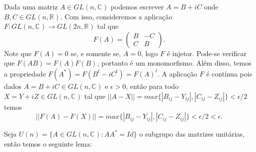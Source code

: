\documentclass[12pt]{book}
\newcommand{\complexo}[1]{\mathbb{C}^{#1}}
\newcommand{\generalgroup}[2]{GL(#1, #2)}
\newcommand{\generalgroupreal}[1]{\generalgroup{#1}{\real{}}}
\newcommand{\generalgroupcomplexo}[1]{\generalgroup{#1}{\complexo{}}}
\newcommand{\matrizunitaria}[1]{U(#1)}
\newcommand{\real}[1]{\mathbb{R}^{#1}}
\begin{document}
	Dada uma matriz $A \in \generalgroupcomplexo{n}$ podemos escrever $A = B+iC$ onde $B,C \in \generalgroupreal{n}$. Com isso, consideremos a aplicação $F:\generalgroupcomplexo{n} \to \generalgroupreal{2n}$ tal que 
	$$
	F(A)=
	\left(
	\begin{array}{cc}
	B & -C
	\\
	C & B
	\end{array}
	\right).
	$$
	Note que $F(A) = 0$ se, e somente se, $A=0$, logo $F$ é injetor. Pode-se verificar que $F(AB)=F(A)F(B)$, portanto é um monomorfismo. Além disso, temos a propriedade $F(A^{*}) = F(B^{t} - iC^{t}) = F(A)^{t}$. A aplicação $F$ é contínua pois dados $A=B+iC \in \generalgroupcomplexo{n}$ e $\epsilon > 0$, então para todo $X= Y+iZ \in \generalgroupcomplexo{n}$ tal que $||A - X||=max \{|B_{ij} - Y_{ij}|,  |C_{ij} - Z_{ij}|\} < \epsilon/2$ temos
	$$
	||F(A) - F(X)|| = max \{|B_{ij} - Y_{ij}|, |C_{ij} - Z_{ij}| \}< \epsilon/2 < \epsilon.
	$$
	
	Seja $\matrizunitaria{n} = \{A\in \generalgroupcomplexo{n}: AA^{*}=Id \}$ o subgrupo das matrizes unitárias, então temos o seguinte lema:
	
\end{document}
